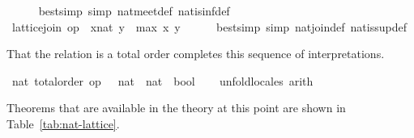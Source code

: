 \begin{isabellebody}
\ \ \ \ \isamarkupfalse%
\ {\isacharparenleft}bestsimp\ simp{\isacharcolon}\ nat{\isachardot}meet{\isacharunderscore}def\ nat{\isachardot}is{\isacharunderscore}inf{\isacharunderscore}def{\isacharparenright}\isanewline
\ \ \isamarkupfalse%
\ {\isachardoublequoteopen}lattice{\isachardot}join\ op\ {\isasymle}\ {\isacharparenleft}x{\isacharcolon}{\isacharcolon}nat{\isacharparenright}\ y\ {\isacharequal}\ max\ x\ y{\isachardoublequoteclose}\isanewline
\ \ \ \ \isamarkupfalse%
\ {\isacharparenleft}bestsimp\ simp{\isacharcolon}\ nat{\isachardot}join{\isacharunderscore}def\ nat{\isachardot}is{\isacharunderscore}sup{\isacharunderscore}def{\isacharparenright}\isanewline
{}\isamarkupfalse%
%
\endisatagvisible
{\isafoldvisible}%
%
\isadelimvisible
%
\endisadelimvisible
%
\begin{isamarkuptext}%
That the relation \isa{{\isasymle}} is a total order completes this
  sequence of interpretations.%
\end{isamarkuptext}%
\isamarkuptrue%
%
\isadelimvisible
%
\endisadelimvisible
%
\isatagvisible
{}\isamarkupfalse%
\ nat{\isacharbang}{\isacharcolon}\ total{\isacharunderscore}order\ {\isachardoublequoteopen}op\ {\isasymle}\ {\isacharcolon}{\isacharcolon}\ nat\ {\isasymRightarrow}\ nat\ {\isasymRightarrow}\ bool{\isachardoublequoteclose}\isanewline
\ \ \isamarkupfalse%
\ unfold{\isacharunderscore}locales\ arith%
\endisatagvisible
{\isafoldvisible}%
%
\isadelimvisible
%
\endisadelimvisible
%
\begin{isamarkuptext}%
Theorems that are available in the theory at this point are shown in
  Table~\ref{tab:nat-lattice}.


\end{isamarkuptext}
\end{isabellebody}
